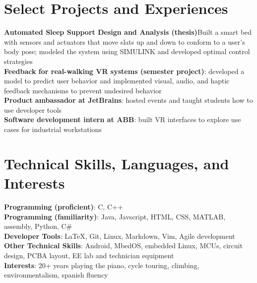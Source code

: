 \documentclass[letterpaper,10pt]{article}
\begin{document}
 \section{Select Projects and Experiences}
 \begin{itemize}[leftmargin=0.15in, rightmargin=0.5in, label={}]
    \small{\item{
    \textbf{Automated Sleep Support Design and Analysis (thesis)}{Built a smart bed with sensors and actuators that move slats up and down to conform to a user's body pose; modeled the system using SIMULINK and developed optimal control strategies }\\
    \textbf{Feedback for real-walking VR systems (semester project)}{: developed a model to predict user behavior and implemented visual, audio, and haptic feedback mechanisms to prevent undesired behavior}\\
    \textbf{Product ambassador at JetBrains}{: hosted events and taught students how to use developer tools}\\
    \textbf{Software development intern at ABB}{: built VR interfaces to explore use cases for industrial workstations}\\
}}
 \end{itemize}

\section{Technical Skills, Languages, and Interests}
 \begin{itemize}[leftmargin=0.15in, label={}]
    \small{\item{
    \textbf{Programming (proficient)}{: C, C++} \\
    \textbf{Programming (familiarity)}{: Java, Javscript, HTML, CSS, MATLAB, assembly, Python, C\# } \\
    \textbf{Developer Tools}{: LaTeX, Git, Linux, Markdown, Vim, Agile development}\\
    \textbf{Other Technical Skills}{: Android, MbedOS, embedded Linux, MCUs, circuit design, PCBA layout, EE lab and technician equipment }\\
    \textbf{Interests}{: 20+ years playing the piano, cycle touring, climbing, environmentalism, spanish fluency}
     
    }}
 \end{itemize}
\end{document}
